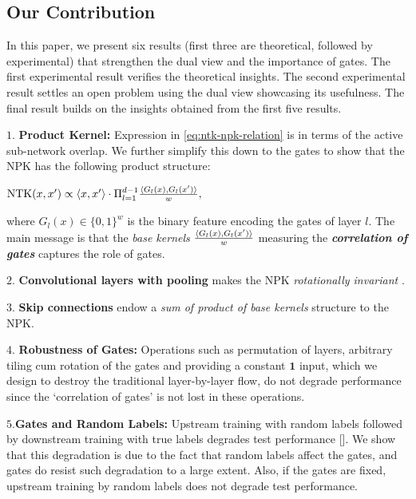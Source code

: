 \subsection{Our Contribution}
In this paper, we present six results (first three are theoretical, followed by experimental) that strengthen the dual view and the importance of gates. The first experimental result verifies the theoretical insights. The second experimental result settles an open problem using the dual view showcasing its usefulness. The final result builds on the insights obtained from the first five results. 

\indent\quad$1.$ \textbf{Product Kernel:} Expression in \eqref{eq:ntk-npk-relation} is in terms of the active sub-network overlap. We further simplify this down to the gates to show that the NPK has the following product structure:
\centerline{$\text{NTK}(x,x') \propto \langle x,x'\rangle\cdot \Pi_{l=1}^{d-1} \frac{\langle G_l(x),G_l(x')\rangle}w,$}

where $G_l(x)\in\{0,1\}^w$ is the binary feature encoding the gates of layer $l$. The main message is that the \emph{base kernels} $\frac{\langle G_l(x),G_l(x')\rangle}w$ measuring the \textbf{\emph{correlation of gates} } captures the role of gates.

\indent\quad$2.$ \textbf{Convolutional layers with pooling} makes the NPK \emph{rotationally invariant} .

\indent\quad$3.$ \textbf{Skip connections} endow a \emph{sum of product of base kernels} structure to the NPK.

\indent\quad$4.$ \textbf{Robustness of Gates:} Operations such as permutation of layers, arbitrary tiling cum rotation of the gates and providing a constant $\mathbf{1}$ input, which we design to destroy the traditional layer-by-layer flow, do not degrade performance since the `correlation of gates' is not lost in these operations.

\indent\quad$5.$\textbf{Gates and Random Labels:} Upstream training with random labels followed by downstream training with true labels degrades test performance []. We show that this degradation is due to the fact that random labels affect the gates, and gates do resist such degradation to a large extent. Also, if the gates are fixed, upstream training by random labels does not degrade test performance.

